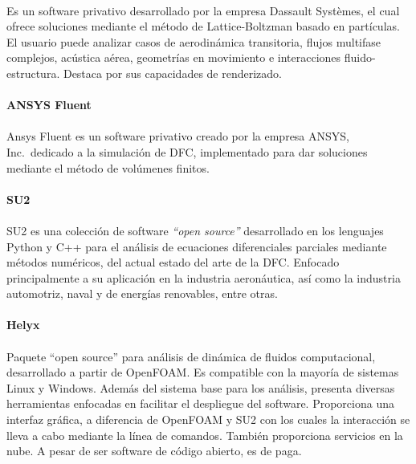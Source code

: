\documentclass[letterpaper, openright, 12pt]{book}
\begin{document}
    \paragraph*{}
    Es un software privativo desarrollado por la empresa Dassault Systèmes, el
    cual ofrece soluciones mediante el método de Lattice-Boltzman basado en
    partículas. El usuario puede analizar casos de aerodinámica transitoria,
    flujos multifase complejos, acústica aérea, geometrías en movimiento e
    interacciones fluido-estructura. Destaca por sus capacidades de
    renderizado.\cite{xflow}

    \paragraph*{ANSYS Fluent}
    \paragraph*{}
    Ansys Fluent es un software privativo creado por la empresa ANSYS, Inc.\
    dedicado a la simulación de DFC, implementado para dar soluciones mediante
    el método de volúmenes finitos.

    \paragraph*{SU2}
    \paragraph*{}
    SU2 es una colección de software \textit{``open source''} desarrollado en
    los lenguajes Python y C++ para el análisis de ecuaciones diferenciales
    parciales mediante métodos numéricos, del actual estado del arte de la
    DFC\@. Enfocado principalmente a su aplicación en la industria aeronáutica,
    así como la industria automotriz, naval y de energías renovables, entre
    otras.\cite{SU2}

    \paragraph*{Helyx}
    \paragraph*{}
    Paquete ``open source'' para análisis de dinámica de fluidos
    computacional, desarrollado a partir de OpenFOAM\@. Es compatible con la
    mayoría de sistemas Linux y Windows. Además del sistema base para los
    análisis, presenta diversas herramientas enfocadas en facilitar el
    despliegue del software. Proporciona una interfaz gráfica, a diferencia de
    OpenFOAM y SU2 con los cuales la interacción se lleva a cabo mediante la
    línea de comandos. También proporciona servicios en la nube. A pesar de ser
    software de código abierto, es de paga.\cite{helyx}
\end{document}
